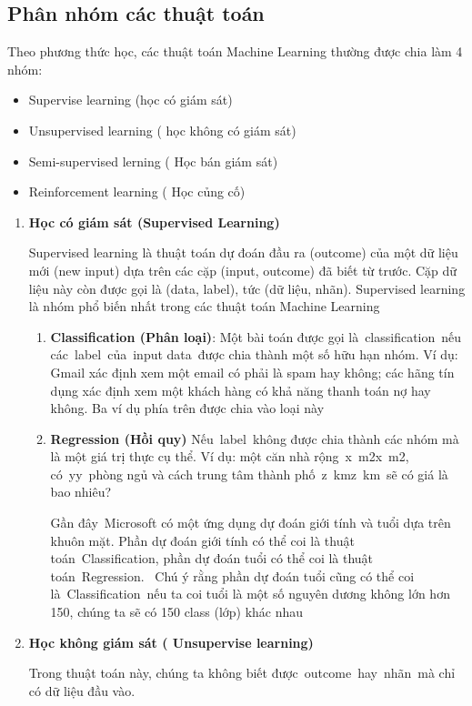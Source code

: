 \subsection{Phân nhóm các thuật toán}
Theo phương thức học, các thuật toán Machine Learning thường được chia làm 4 nhóm:
\begin{itemize}
\item Supervise learning (học có giám sát)
\item Unsupervised learning ( học không có giám sát)
\item Semi-supervised lerning ( Học bán giám sát)
\item Reinforcement learning ( Học củng cố)
\end{itemize}
\begin{enumerate}
\item \textbf{Học có giám sát (Supervised Learning)}
\par
Supervised learning là thuật toán dự đoán đầu ra (outcome) của một dữ liệu mới (new input) dựa trên các cặp (input, outcome) đã biết từ trước. 
Cặp dữ liệu này còn được gọi là (data, label), tức (dữ liệu, nhãn). 
Supervised learning là nhóm phổ biến nhất trong các thuật toán Machine Learning
\begin{enumerate}
\item \textbf{Classification (Phân loại)}: Một bài toán được gọi là classification nếu các label của input data được chia thành một số hữu hạn nhóm. 
Ví dụ: Gmail xác định xem một email có phải là spam hay không; các hãng tín dụng xác định xem một khách hàng có khả năng thanh toán nợ hay không. 
Ba ví dụ phía trên được chia vào loại này
\par
\item \textbf{Regression (Hồi quy)}
Nếu label không được chia thành các nhóm mà là một giá trị thực cụ thể. Ví dụ: một căn nhà rộng x m2x m2, có yy phòng ngủ và cách trung tâm thành phố z kmz km sẽ có giá là bao nhiêu?
\par
Gần đây Microsoft có một ứng dụng dự đoán giới tính và tuổi dựa trên khuôn mặt. 
Phần dự đoán giới tính có thể coi là thuật toán Classification, phần dự đoán tuổi có thể coi là thuật toán Regression. 
Chú ý rằng phần dự đoán tuổi cũng có thể coi là Classification nếu ta coi tuổi là một số nguyên dương không lớn hơn 150, chúng ta sẽ có 150 class (lớp) khác nhau
\end{enumerate}
\item \textbf{Học không giám sát ( Unsupervise learning)}
\par
Trong thuật toán này, chúng ta không biết được outcome hay nhãn mà chỉ có dữ liệu đầu vào. 

\end{enumerate}
